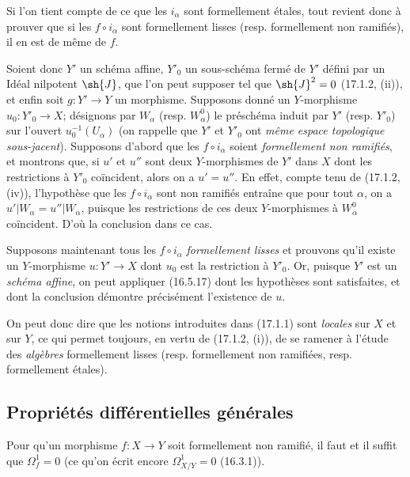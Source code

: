 Si l'on tient compte de ce que les $i_\alpha$ sont formellement étales, tout revient donc à prouver que si les $f\circ i_\alpha$ sont formellement lisses (resp. formellement non ramifiés), il en est de même de $f$.

Soient donc $Y'$ un schéma affine, $Y'_0$ un sous-schéma fermé de $Y'$ défini par un Idéal nilpotent $\sh{J}$, que l'on peut supposer tel que $\sh{J}^2=0$ (17.1.2, (ii)), et enfin soit $g:Y'\to Y$ un morphisme. Supposons donné un $Y$-morphisme $u_0:Y'_0\to X$; désignons par $W_\alpha$ (resp. $W^0_\alpha$) le préschéma induit par $Y'$ (resp. $Y'_0$) sur l'ouvert $u_0^{-1}(U_\alpha)$ (on rappelle que $Y'$ et $Y'_0$ ont \emph{même espace topologique sous-jacent}). Supposons d'abord que les $f\circ i_\alpha$ soient \emph{formellement non ramifiés}, et montrons que, si $u'$ et $u''$ sont deux $Y$-morphismes de $Y'$ dans $X$ dont les restrictions à $Y'_0$ coïncident, alors on a $u'=u''$. En effet, compte tenu de (17.1.2, (iv)), l'hypothèse que les $f\circ i_\alpha$ sont non ramifiés entraîne que pour tout $\alpha$, on a $u'|W_\alpha=u''|W_\alpha$, puisque les restrictions de ces deux $Y$-morphismes à $W^0_\alpha$ coïncident. D'où la conclusion dans ce cas.

Supposons maintenant tous les $f\circ i_\alpha$ \emph{formellement lisses} et prouvons qu'il existe un $Y$-morphisme $u:Y'\to X$ dont $u_0$ est la restriction à $Y'_0$. Or, puisque $Y'$ est un \emph{schéma affine}, on peut appliquer (16.5.17) dont les hypothèses sont satisfaites, et dont la conclusion démontre précisément l'existence de $u$.

On peut donc dire que les notions introduites dans (17.1.1) sont \emph{locales} sur $X$ et sur $Y$, ce qui permet toujours, en vertu de (17.1.2, (i)), de se ramener à l'étude des \emph{algèbres} formellement lisses (resp. formellement non ramifiées, resp. formellement étales).

\subsection{Propriétés différentielles générales}

\begin{proposition}[17.2.1]
\label{IV.17.2.1}
Pour qu'un morphisme $f:X\to Y$ soit formellement non ramifié, il faut et il suffit que $\Omega_f^1=0$ (ce qu'on écrit encore $\Omega_{X/Y}^1=0$ (16.3.1)).
\end{proposition}

